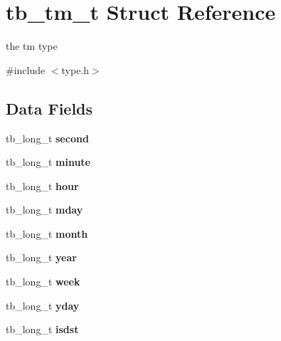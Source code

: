 \hypertarget{structtb__tm__t}{\section{tb\-\_\-tm\-\_\-t Struct Reference}
\label{structtb__tm__t}
}


the tm type  




{\ttfamily \#include $<$type.\-h$>$}

\subsection*{Data Fields}
\begin{DoxyCompactItemize}
\item 
\hypertarget{structtb__tm__t_a51771c2e51bab4d03e50af230425c9df}{tb\-\_\-long\-\_\-t {\bfseries second}}\label{structtb__tm__t_a51771c2e51bab4d03e50af230425c9df}

\item 
\hypertarget{structtb__tm__t_a13fd772a7f145ceea76843ece19c5113}{tb\-\_\-long\-\_\-t {\bfseries minute}}\label{structtb__tm__t_a13fd772a7f145ceea76843ece19c5113}

\item 
\hypertarget{structtb__tm__t_a08d4187975548291dca175824703f584}{tb\-\_\-long\-\_\-t {\bfseries hour}}\label{structtb__tm__t_a08d4187975548291dca175824703f584}

\item 
\hypertarget{structtb__tm__t_a66d1816051a703e39f44ebb2992efeeb}{tb\-\_\-long\-\_\-t {\bfseries mday}}\label{structtb__tm__t_a66d1816051a703e39f44ebb2992efeeb}

\item 
\hypertarget{structtb__tm__t_a094c1582ccd60f106a0d2950af7185a8}{tb\-\_\-long\-\_\-t {\bfseries month}}\label{structtb__tm__t_a094c1582ccd60f106a0d2950af7185a8}

\item 
\hypertarget{structtb__tm__t_a02923d870c2bd6e1f554fdf89f0a7a0f}{tb\-\_\-long\-\_\-t {\bfseries year}}\label{structtb__tm__t_a02923d870c2bd6e1f554fdf89f0a7a0f}

\item 
\hypertarget{structtb__tm__t_a96e445ad80f79f994341b4bb3041665a}{tb\-\_\-long\-\_\-t {\bfseries week}}\label{structtb__tm__t_a96e445ad80f79f994341b4bb3041665a}

\item 
\hypertarget{structtb__tm__t_ae6044ea7b9be413afd62186120ac3837}{tb\-\_\-long\-\_\-t {\bfseries yday}}\label{structtb__tm__t_ae6044ea7b9be413afd62186120ac3837}

\item 
\hypertarget{structtb__tm__t_ae7fc480c6d32219afc02e3f33b71468e}{tb\-\_\-long\-\_\-t {\bfseries isdst}}\label{structtb__tm__t_ae7fc480c6d32219afc02e3f33b71468e}

\end{DoxyCompactItemize}



